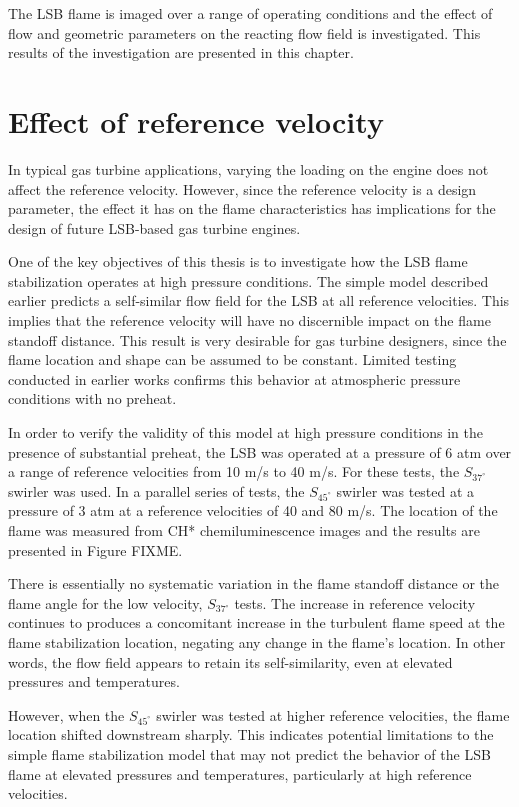 The LSB flame is imaged over a range of operating conditions and the effect of flow and geometric parameters on the reacting flow field is investigated.
This results of the investigation are presented in this chapter.

\section{Effect of reference velocity}

In typical gas turbine applications, varying the loading on the engine does not affect the reference velocity.
However, since the reference velocity is a design parameter, the effect it has on the flame characteristics has implications for the design of future LSB-based gas turbine engines.

One of the key objectives of this thesis is to investigate how the LSB flame stabilization operates at high pressure conditions.
The simple model described earlier predicts a self-similar flow field for the LSB at all reference velocities.
This implies that the reference velocity will have no discernible impact on the flame standoff distance.
This result is very desirable for gas turbine designers, since the flame location and shape can be assumed to be constant.
Limited testing conducted in earlier works confirms this behavior at atmospheric pressure conditions with no preheat.

In order to verify the validity of this model at high pressure conditions in the presence of substantial preheat, the LSB was operated at a pressure of 6 atm over a range of reference velocities from 10 m/s to 40 m/s. For these tests, the \(S_{37^\circ}\) swirler was used.
In a parallel series of tests, the \(S_{45^\circ}\) swirler was tested at a pressure of 3 atm at a reference velocities of 40 and 80 m/s.
The location of the flame was measured from CH* chemiluminescence images and the results are presented in Figure FIXME.

There is essentially no systematic variation in the flame standoff distance or the flame angle for the low velocity, \(S_{37^\circ}\) tests.
The increase in reference velocity continues to produces a concomitant increase in the turbulent flame speed at the flame stabilization location, negating any change in the flame's location.
In other words, the flow field appears to retain its self-similarity, even at elevated pressures and temperatures.

However, when the \(S_{45^\circ}\) swirler was tested at higher reference velocities, the flame location shifted downstream sharply.
This indicates potential limitations to the simple flame stabilization model that may not predict the behavior of the LSB flame at elevated pressures and temperatures, particularly at high reference velocities.

